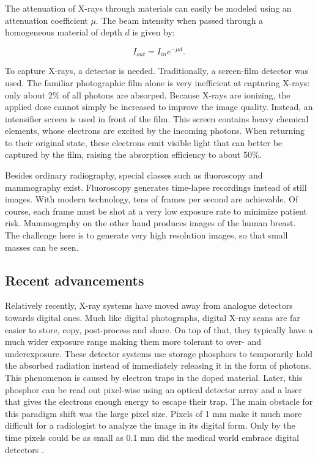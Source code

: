 The attenuation of X-rays through materials can easily be modeled using an
attenuation coefficient $\mu$. The beam intensity when passed through a
homogeneous material of depth $d$ is given by: 

\begin{equation}
	I_{out} = I_{in} e^{-\mu d}.
\end{equation}

To capture X-rays, a detector is needed. Traditionally, a screen-film detector
was used. The familiar photographic film alone is very inefficient
at capturing X-rays: only about 2\% of all photons are absorped. Because X-rays
are ionizing, the applied dose cannot simply be increased to improve the
image quality. Instead, an intensifier screen is used in front of the film. This
screen contains heavy chemical elements, whose electrons are excited by the
incoming photons. When returning to their original state, these electrons emit
visible light that can better be captured by the film, raising the absorption
efficiency to about 50\%.

Besides ordinary radiography, special classes such as fluoroscopy and
mammography exist. Fluoroscopy generates time-lapse recordings instead of still
images. With modern technology, tens of frames per second are achievable. Of
course, each frame must be shot at a very low exposure rate to minimize patient
risk. Mammography on the other hand produces images of the human breast. The
challenge here is to generate very high resolution images, so that small masses
can be seen.

\subsection{Recent advancements}\label{ssec:recentradio}
Relatively recently, X-ray systems have moved away from analogue detectors
towards digital ones. Much like digital photographs, digital X-ray scans are far
easier to store, copy, post-process and share. On top of that, they typically
have a much wider exposure range making them more tolerant to over- and
underexposure. These detector systems use storage phosphors to temporarily hold
the absorbed radiation instead of immediately releasing it in the form of
photons. This phenomenon is caused by electron traps in the doped material.
Later, this phosphor can be read out pixel-wise using an optical detector array
and a laser that gives the electrons enough energy to escape their trap. The
main obstacle for this paradigm shift was the large pixel size. Pixels of 1 mm make
it much more difficult for a radiologist to analyze the image in its digital
form. Only by the time pixels could be as small as 0.1 mm did the medical world
embrace digital detectors \cite{review}.

